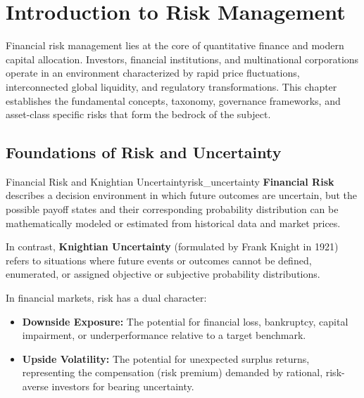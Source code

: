 
\chapter{Introduction to Risk Management}

Financial risk management lies at the core of quantitative finance and modern capital allocation. Investors, financial institutions, and multinational corporations operate in an environment characterized by rapid price fluctuations, interconnected global liquidity, and regulatory transformations. This chapter establishes the fundamental concepts, taxonomy, governance frameworks, and asset-class specific risks that form the bedrock of the subject.

\section{Foundations of Risk and Uncertainty}

\begin{definition}{Financial Risk and Knightian Uncertainty}{risk_uncertainty}
\textbf{Financial Risk} describes a decision environment in which future outcomes are uncertain, but the possible payoff states and their corresponding probability distribution can be mathematically modeled or estimated from historical data and market prices.

In contrast, \textbf{Knightian Uncertainty} (formulated by Frank Knight in 1921) refers to situations where future events or outcomes cannot be defined, enumerated, or assigned objective or subjective probability distributions.
\end{definition}

In financial markets, risk has a dual character:
\begin{itemize}[leftmargin=1.5em, itemsep=2pt]
    \item \textbf{Downside Exposure:} The potential for financial loss, bankruptcy, capital impairment, or underperformance relative to a target benchmark.
    \item \textbf{Upside Volatility:} The potential for unexpected surplus returns, representing the compensation (risk premium) demanded by rational, risk-averse investors for bearing uncertainty.
\end{itemize}

